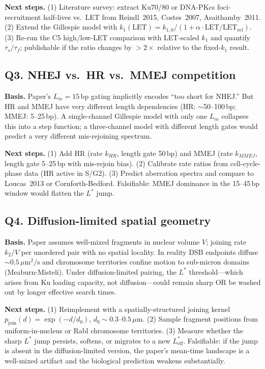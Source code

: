 \textbf{Next steps.} (1) Literature survey: extract Ku70/80 or DNA-PKcs foci-recruitment
half-lives vs.\ LET from Reindl~2015, Costes~2007, Asaithamby~2011. (2) Extend the
Gillespie model with $k_1(\text{LET}) = k_{1,0}/(1 + \alpha \cdot \text{LET}/\text{LET}_{\text{ref}})$.
(3) Re-run the C5 high/low-LET comparison with LET-scaled $k_1$ and quantify
$\tau_s/\tau_f$; publishable if the ratio changes by $>2\times$ relative to the
fixed-$k_1$ result.

\subsection*{Q3. NHEJ vs.\ HR vs.\ MMEJ competition}

\textbf{Basis.} Paper's $L_m=15$\,bp gating implicitly encodes ``too short for NHEJ.''
But HR and MMEJ have very different length dependencies (HR: $\sim$50--100\,bp; MMEJ:
5--25\,bp). A single-channel Gillespie model with only one $L_m$ collapses this into a
step function; a three-channel model with different length gates would predict a very
different mis-rejoining spectrum.

\textbf{Next steps.} (1) Add HR (rate $k_{HR}$, length gate 50\,bp) and MMEJ (rate
$k_{MMEJ}$, length gate 5--25\,bp with mis-rejoin bias). (2) Calibrate rate ratios from
cell-cycle-phase data (HR active in S/G2). (3) Predict aberration spectra and compare
to Loucas~2013 or Cornforth-Bedford. Falsifiable: MMEJ dominance in the 15--45\,bp
window would flatten the $L^\ast$ jump.

\subsection*{Q4. Diffusion-limited spatial geometry}

\textbf{Basis.} Paper assumes well-mixed fragments in nuclear volume $V$; joining rate
$k_2/V$ per unordered pair with no spatial locality. In reality DSB endpoints diffuse
$\sim 0.5\,\mu\text{m}^2/\text{s}$ and chromosome territories confine motion to
sub-micron domains (Meaburn-Misteli). Under diffusion-limited pairing, the $L^\ast$
threshold---which arises from Ku loading capacity, not diffusion---could remain sharp
OR be washed out by longer effective search times.

\textbf{Next steps.} (1) Reimplement with a spatially-structured joining kernel
$p_{\text{join}}(d) = \exp(-d/d_0)$, $d_0 \sim 0.3\text{--}0.5\,\mu$m. (2) Sample
fragment positions from uniform-in-nucleus or Rabl chromosome territories. (3) Measure
whether the sharp $L^\ast$ jump persists, softens, or migrates to a new
$L^\ast_{\text{eff}}$. Falsifiable: if the jump is absent in the diffusion-limited
version, the paper's mean-time landscape is a well-mixed artifact and the biological
prediction weakens substantially.

